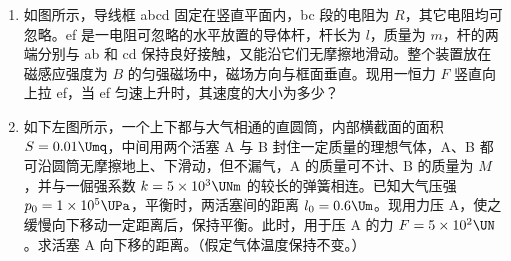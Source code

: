 \documentclass[\gkver]{gaokaozhenti}
\begin{document}
\begin{enumerate}

\item
如图所示，导线框 abcd 固定在竖直平面内，bc 段的电阻为 $R$，其它电阻均可忽略。ef 是一电阻可忽略的水平放置的导体杆，杆长为 $l$，质量为 $m$，杆的两端分别与 ab 和 cd 保持良好接触，又能沿它们无摩擦地滑动。整个装置放在磁感应强度为 $B$ 的匀强磁场中，磁场方向与框面垂直。现用一恒力 $F$ 竖直向上拉 ef，当 ef 匀速上升时，其速度的大小为多少？



\item
如下左图所示，一个上下都与大气相通的直圆筒，内部横截面的面积 $S = 0.01\Umq$，中间用两个活塞 A 与 B 封住一定质量的理想气体，A、B 都可沿圆筒无摩擦地上、下滑动，但不漏气，A 的质量可不计、B 的质量为 $M$，并与一倔强系数 $k = 5\times10^{3}\UNm$ 的较长的弹簧相连。已知大气压强 $p_{0} = 1\times10^{5}\UPa$，平衡时，两活塞间的距离 $l_{0} = 0.6\Um$。现用力压 A，使之缓慢向下移动一定距离后，保持平衡。此时，用于压 A 的力 $F = 5\times10^{2}\UN$。求活塞 A 向下移的距离。（假定气体温度保持不变。）


\end{enumerate}
\end{document}
